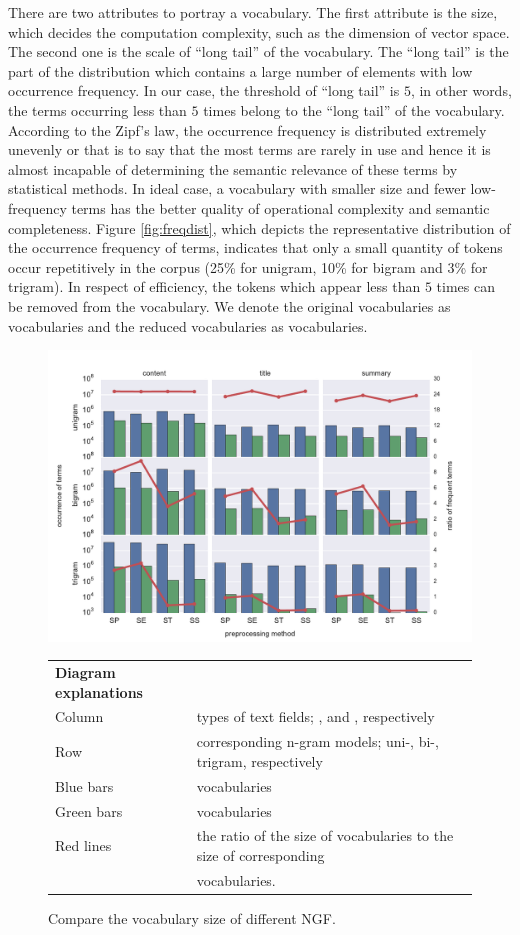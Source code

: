There are two attributes to portray a vocabulary. The first attribute is the size, which decides the computation complexity, such as the dimension of vector space. The second one is the scale of ``long tail'' of the vocabulary. The ``long tail'' is the part of the distribution which contains a large number of elements with low occurrence frequency. In our case, the threshold of ``long tail'' is $5$, in other words, the terms occurring less than $5$ times belong to the ``long tail'' of the vocabulary. According to the Zipf's law, the occurrence frequency is distributed extremely unevenly or that is to say that the most terms are rarely in use and hence it is almost incapable of determining the semantic relevance of these terms by statistical methods. In ideal case, a vocabulary with smaller size and fewer low-frequency terms has the better quality of operational complexity and semantic completeness. Figure \ref{fig:freqdist}, which depicts the representative distribution of the occurrence frequency of terms, indicates that only a small quantity of tokens occur repetitively in the corpus (25\% for unigram, 10\% for bigram and 3\% for trigram). In respect of efficiency, the tokens which appear less than $5$ times can be removed from the vocabulary. We denote the original vocabularies as \ifull{} vocabularies and the reduced vocabularies as \icommon{} vocabularies. 

\begin{figure}[!htb]
    \centering
    \includegraphics[width=\textwidth]{fig/vocab_size}
    \caption{Compare the vocabulary size of different NGF.}
    \begin{tabular}{ll} \textbf{Diagram explanations} & \\ Column & types of text fields; \icontent{}, \ititle{} and \isummary{}, respectively \\ Row & corresponding n-gram models; uni-, bi-, trigram, respectively \\ Blue bars & \ifull{} vocabularies \\ Green bars & \icommon{} vocabularies \\ Red lines & the ratio of the size of \icommon{} vocabularies to the size of corresponding \\ & \ifull{} vocabularies. \end{tabular}
    \label{fig:vocab_size}
\end{figure}


